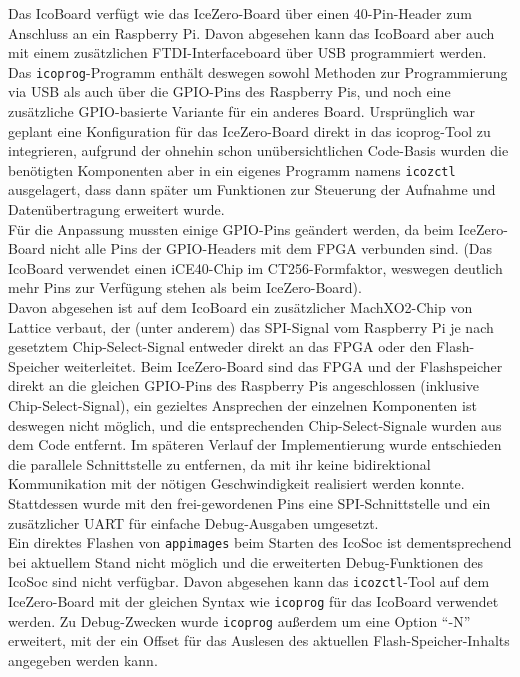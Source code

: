 {Das IcoBoard verfügt wie das IceZero-Board über einen 40-Pin-Header zum Anschluss an ein Raspberry Pi. Davon abgesehen kann das IcoBoard aber auch mit einem zusätzlichen FTDI-Interfaceboard über USB programmiert werden. Das {\tt icoprog}-Programm enthält deswegen sowohl Methoden zur Programmierung via USB als auch über die GPIO-Pins des Raspberry Pis, und noch eine zusätzliche GPIO-basierte Variante für ein anderes Board. Ursprünglich war geplant eine Konfiguration für das IceZero-Board direkt in das icoprog-Tool zu integrieren, aufgrund der ohnehin schon unübersichtlichen Code-Basis wurden die benötigten Komponenten aber in ein eigenes Programm namens {\tt icozctl} ausgelagert, dass dann später um Funktionen zur Steuerung der Aufnahme und Datenübertragung erweitert wurde.\\ 
Für die Anpassung mussten einige GPIO-Pins geändert werden, da beim IceZero-Board nicht alle Pins der GPIO-Headers mit dem FPGA verbunden sind. (Das IcoBoard verwendet einen iCE40-Chip im CT256-Formfaktor, weswegen deutlich mehr Pins zur Verfügung stehen als beim IceZero-Board\cite{web:trenz_icoboard}).\\
Davon abgesehen ist auf dem IcoBoard ein zusätzlicher MachXO2-Chip von Lattice verbaut, der (unter anderem) das SPI-Signal vom Raspberry Pi je nach gesetztem Chip-Select-Signal entweder direkt an das FPGA oder den Flash-Speicher weiterleitet. Beim IceZero-Board sind das FPGA und der Flashspeicher direkt an die gleichen GPIO-Pins des Raspberry Pis angeschlossen (inklusive Chip-Select-Signal), ein gezieltes Ansprechen der einzelnen Komponenten ist deswegen nicht möglich, und die entsprechenden Chip-Select-Signale wurden aus dem Code entfernt. 
Im späteren Verlauf der Implementierung wurde entschieden die parallele Schnittstelle zu entfernen, da mit ihr keine bidirektional Kommunikation mit der nötigen Geschwindigkeit realisiert werden konnte. Stattdessen wurde mit den frei-gewordenen Pins eine SPI-Schnittstelle und ein zusätzlicher UART für einfache Debug-Ausgaben umgesetzt.\\
Ein direktes Flashen von {\tt appimages} beim Starten des IcoSoc ist dementsprechend bei aktuellem Stand nicht möglich und die erweiterten Debug-Funktionen des IcoSoc sind nicht verfügbar. 
Davon abgesehen kann das {\tt icozctl}-Tool auf dem IceZero-Board mit der gleichen Syntax wie {\tt icoprog} für das IcoBoard verwendet werden.
Zu Debug-Zwecken wurde {\tt icoprog} außerdem um eine Option ``-N'' erweitert, mit der ein Offset für das Auslesen des aktuellen Flash-Speicher-Inhalts angegeben werden kann.

}
